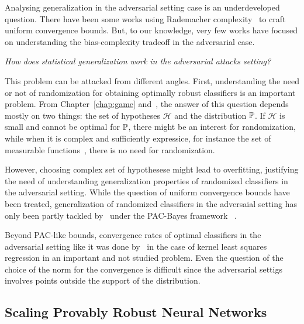 Analysing generalization in the adversarial setting case is an underdeveloped question. There have been some works using Rademacher complexity~\citep{yin2019rademacher,awasthi2020adversarialx} to craft uniform convergence bounds. But, to our knowledge, very few works have focused on  understanding the bias-complexity tradeoff in the adversarial case.

\begin{tcolorbox}[colback=grund,colframe=rahmen]
    \begin{center}
    \emph{How does statistical generalization work in the adversarial attacks setting?}
    \end{center}
\end{tcolorbox}

This problem can be attacked from different angles. First, understanding the need or not of randomization for obtaining optimally robust classifiers is an important problem. From Chapter~\ref{chap:game} and~\citet{pydi2021many}, the answer of this question depends mostly on two things: the set of hypotheses $\mathcal{H}$ and the distribution $\mathbb{P}$. If $\mathcal{H}$ is small and cannot be optimal for $\mathbb{P}$, there might be an interest for randomization, while when it is  complex and sufficiently expressice, for instance the set of measurable functions~\citep{pydi2021many}, there is no need for randomization. 

However, choosing complex set of hypothesese might lead to overfitting, justifying the need of understanding generalization properties of randomized classifiers in the adversarial setting. While the question of uniform convergence bounds have been treated, generalization of randomized classifiers in the adversaial setting has only been partly tackled by~\citet{viallard2021pac} under the PAC-Bayes framework~\citep{guedj2019primer} . 

Beyond PAC-like bounds,  convergence rates of optimal classifiers in the adversarial setting like it was done by~\citet{fischer2020sobolev} in the case of kernel least squares regression in an important and not studied problem. Even the question of the choice of the norm for the convergence is difficult since the adversarial settigs involves points outside the support of the distribution. 



\subsection{Scaling Provably Robust Neural Networks}

